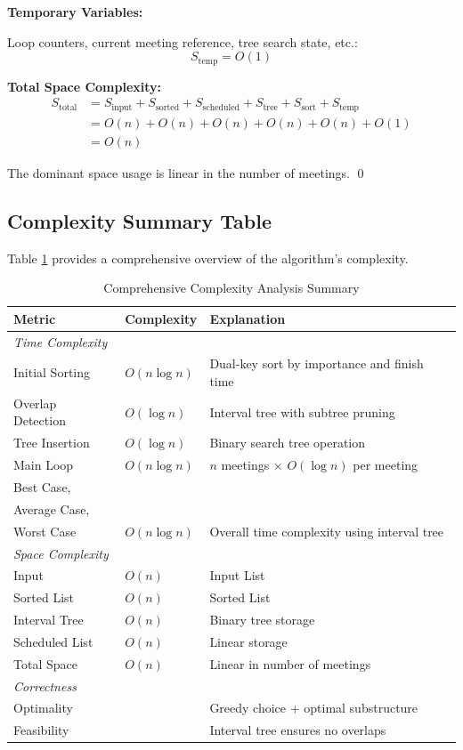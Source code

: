 \documentclass[conference]{IEEEtran}
\begin{document}
\textbf{Temporary Variables:}

Loop counters, current meeting reference, tree search state, etc.:
\begin{equation}
S_{\text{temp}} = O(1)
\end{equation}

\textbf{Total Space Complexity:}
\begin{align}
S_{\text{total}} &= S_{\text{input}} + S_{\text{sorted}} + S_{\text{scheduled}} + S_{\text{tree}} + S_{\text{sort}} + S_{\text{temp}} \\
&= O(n) + O(n) + O(n) + O(n) + O(n) + O(1) \\
&= O(n)
\end{align}

The dominant space usage is linear in the number of meetings. \qed

\subsection{Complexity Summary Table}

Table \ref{tab:complexity_summary} provides a comprehensive overview of the algorithm's complexity.

\begin{table}[htbp]
\centering
\caption{Comprehensive Complexity Analysis Summary}
\label{tab:complexity_summary}
\begin{tabular}{@{}llp{5cm}@{}}
\toprule
\textbf{Metric} & \textbf{Complexity} & \textbf{Explanation} \\ \midrule
\multicolumn{3}{l}{\textit{Time Complexity}} \\
Initial Sorting & $O(n \log n)$ & Dual-key sort by importance and finish time \\
Overlap Detection & $O(\log n)$ & Interval tree with subtree pruning \\
Tree Insertion & $O(\log n)$ & Binary search tree operation \\
Main Loop & $O(n \log n)$ & $n$ meetings $\times$ $O(\log n)$ per meeting \\
Best Case,\\Average Case,\\Worst Case & $O(n \log n)$ & Overall time complexity using interval tree \\
\midrule
\multicolumn{3}{l}{\textit{Space Complexity}} \\
Input & $O(n)$ & Input List \\
Sorted List & $O(n)$ & Sorted List\\
Interval Tree & $O(n)$ & Binary tree storage \\
Scheduled List & $O(n)$ & Linear storage \\
Total Space & $O(n)$ & Linear in number of meetings \\
\midrule
\multicolumn{3}{l}{\textit{Correctness}} \\
Optimality &  & Greedy choice + optimal substructure \\
Feasibility & & Interval tree ensures no overlaps \\
\bottomrule
\end{tabular}
\end{table}
\end{document}
